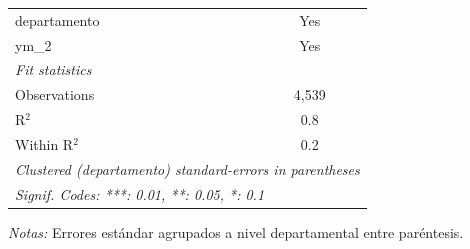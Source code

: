 \documentclass[12pt]{article}
\begin{document}
\begin{table}[htbp]
\begin{threeparttable}
\begin{tabular}{lc}
      departamento                                                                                                                & Yes\\  
      ym\_2                                                                                                                       & Yes\\  
      \midrule
      \emph{Fit statistics}\\
      Observations                                                                                                                & 4,539\\  
      R$^2$                                                                                                                       & 0.8\\  
      Within R$^2$                                                                                                                & 0.2\\  
      \midrule \midrule
      \multicolumn{2}{l}{\emph{Clustered (departamento) standard-errors in parentheses}}\\
      \multicolumn{2}{l}{\emph{Signif. Codes: ***: 0.01, **: 0.05, *: 0.1}}\\
   \end{tabular}


\begin{tablenotes}
\footnotesize
\item \textit{Notas:} Errores estándar agrupados a nivel departamental entre paréntesis.
\end{tablenotes}
\end{threeparttable}
\end{table}
\end{document}

